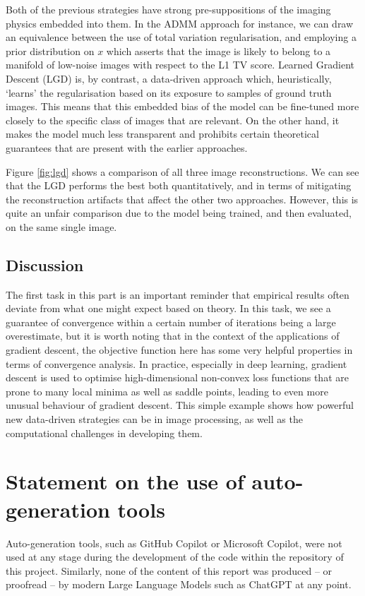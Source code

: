 \documentclass[12pt]{article}
\begin{document}
Both of the previous strategies have strong pre-suppositions of the imaging physics embedded into them.
In the ADMM approach for instance, we can draw an equivalence between the use of total variation regularisation,
and employing a prior distribution on $x$ which asserts that the image is likely to belong to a manifold of low-noise images with respect to the L1 TV score.
Learned Gradient Descent (LGD) is, by contrast, a data-driven approach which, heuristically, `learns' the regularisation based on its exposure to samples of ground truth images.
This means that this embedded bias of the model can be fine-tuned more closely to the specific class of images that are relevant.
On the other hand, it makes the model much less transparent and prohibits certain theoretical guarantees that are present with the earlier approaches.

Figure \ref{fig:lgd} shows a comparison of all three image reconstructions.
We can see that the LGD performs the best both quantitatively,
and in terms of mitigating the reconstruction artifacts that affect the other two approaches.
However, this is quite an unfair comparison due to the model being trained, and then evaluated, on the same single image.

\subsection{Discussion}

The first task in this part is an important reminder that empirical results often deviate from what one might expect based on theory.
In this task, we see a guarantee of convergence within a certain number of iterations being a large overestimate,
but it is worth noting that in the context of the applications of gradient descent,
the objective function here has some very helpful properties in terms of convergence analysis.
In practice, especially in deep learning, gradient descent is used to optimise high-dimensional non-convex loss functions that are prone to many local minima as well as saddle points,
leading to even more unusual behaviour of gradient descent.
This simple example shows how powerful new data-driven strategies can be in image processing,
as well as the computational challenges in developing them.




\appendix

\section{Statement on the use of auto-generation tools}

Auto-generation tools, such as GitHub Copilot or Microsoft Copilot, were not used at any stage during the development of the code within the repository of this project.
Similarly, none of the content of this report was produced -- or proofread -- by modern Large Language Models such as ChatGPT at any point.
\end{document}
